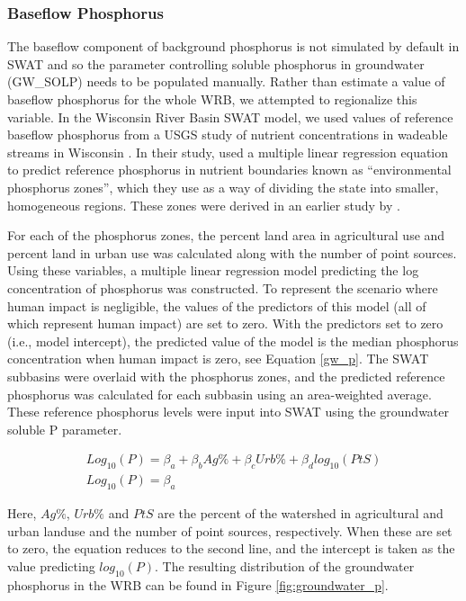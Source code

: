 \subsubsection{Baseflow Phosphorus}\label{sec:gwp}
	The baseflow component of background phosphorus is not simulated by default in SWAT and so the parameter controlling soluble phosphorus in groundwater (GW\_SOLP) needs to be populated manually. Rather than estimate a value of baseflow phosphorus for the whole WRB, we attempted to regionalize this variable. In the Wisconsin River Basin SWAT model, we used values of reference baseflow phosphorus from a USGS study of nutrient concentrations in wadeable streams in Wisconsin \citep{robertson_wadeable_2006}. In their study, \citet{robertson_wadeable_2006} used a multiple linear regression equation to predict reference phosphorus in nutrient boundaries known as ``environmental phosphorus zones'', which they use as a way of dividing the state into smaller, homogeneous regions. These zones were derived in an earlier study by \citet{robertson_phosphoruszones_2006}.
	
	For each of the phosphorus zones, the percent land area in agricultural use and percent land in urban use was calculated along with the number of point sources. Using these variables, a multiple linear regression model predicting the log concentration of phosphorus was constructed. To represent the scenario where human impact is negligible, the values of the predictors of this model (all of which represent human impact) are set to zero. With the predictors set to zero (i.e., model intercept), the predicted value of the model is the median phosphorus concentration when human impact is zero, see Equation \ref{gw_p}. The SWAT subbasins were overlaid with the phosphorus zones, and the predicted reference phosphorus was calculated for each subbasin using an area-weighted average. These reference phosphorus levels were input into SWAT using the groundwater soluble P parameter.
	
	
	\begin{eqnarray}
	Log_{10}(P) = \beta_a + \beta_bAg\% + \beta_cUrb\% + \beta_dlog_{10}(PtS)      \\
	
	Log_{10}(P) = \beta_a 
	\end{eqnarray}
		
	Here, $Ag\%$, $Urb\%$ and $PtS$ are the percent of the watershed in agricultural and urban landuse and the number of point sources, respectively. When these are set to zero, the equation reduces to the second line, and the intercept is taken as the value predicting $log_{10}(P)$. The resulting distribution of the groundwater phosphorus in the WRB can be found in Figure \ref{fig:groundwater_p}.
	
